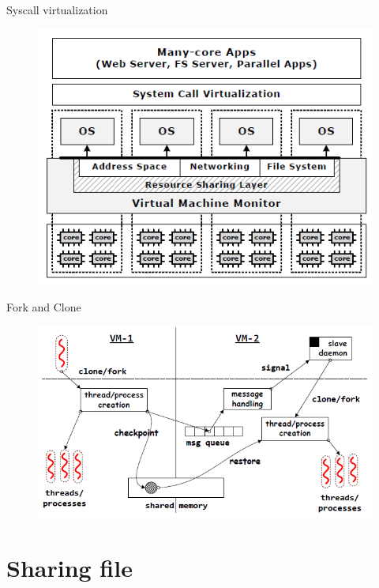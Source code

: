 \documentclass{beamer}
\begin{document}
	\begin{frame}{Syscall virtualization}
	
		\begin{figure} [H]
			\centering
			\includegraphics[scale=0.40]{img/syscall-virtualization}
		\end{figure}	

	\end{frame}
	
	\begin{frame}{Fork and Clone}
	
		\begin{figure} [H]
			\centering
			\includegraphics[scale=0.40]{img/cerberus-fork-clone}
		\end{figure}	
	
	\end{frame}

\section{Sharing file}
	
\end{document}
